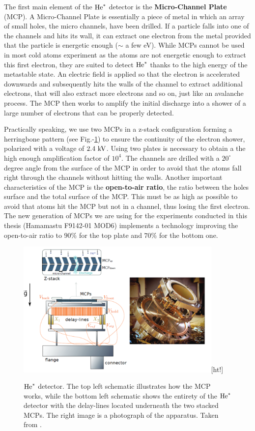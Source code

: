 The first main element of the $\mathrm{He}^*$ detector is the \textbf{Micro-Channel Plate} (MCP). A Micro-Channel Plate is essentially a piece of metal in which an array of small holes, the micro channels, have been drilled. If a particle falls into one of the channels and hits its wall, it can extract one electron from the metal provided that the particle is energetic enough ($\sim$ a few eV). While MCPs cannot be used in most cold atoms experiment as the atoms are not energetic enough to extract this first electron, they are suited to detect $\mathrm{He}^*$ thanks to the high energy of the metastable state. An electric field is applied so that the electron is accelerated downwards and subsequently hits the walls of the channel to extract additional electrons, that will also extract more electrons and so on, just like an avalanche process. The MCP then works to amplify the initial discharge into a shower of a large number of electrons that can be properly detected. 

Practically speaking, we use two MCPs in a z-stack configuration forming a herringbone pattern (see Fig.-\ref{fig:MCP}) to ensure the continuity of the electron shower, polarized with a voltage of $2.4 \ \rm{kV}$. Using two plates is necessary to obtain a the high enough amplification factor of $10^4$. The channels are drilled with a $20^{\circ}$ degree angle from the surface of the MCP in order to avoid that the atoms fall right through the channels without hitting the walls. Another important characteristics of the MCP is the \textbf{open-to-air ratio}, \ie the ratio between the holes surface and the total surface of the MCP. This must be as high as possible to avoid that atoms hit the MCP but not in a channel, thus losing the first electron. The new generation of MCPs we are using for the experiments conducted in this thesis (Hamamastu F9142-01 MOD6) implements a technology improving the open-to-air ratio to $90\%$ for the top plate and $70 \%$ for the bottom one.

\begin{figure}
    \centering
    \includegraphics[width=0.9\textwidth]{Fig/Chapter3/MCP.png}[ht!]
    \caption{$\mathrm{He}^*$ detector. The top left schematic illustrates how the MCP works, while the bottom left schematic shows the entirety of the $\mathrm{He}^*$ detector with the delay-lines located underneath the two stacked MCPs. The right image is a photograph of the apparatus. Taken from \cite{cayla_these}.}
    \label{fig:MCP}
\end{figure}

